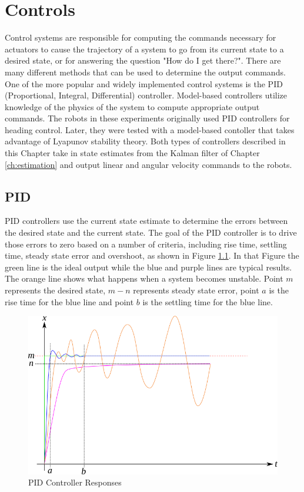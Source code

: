 \chapter{Controls}
\label{ch:controls}
Control systems are responsible for computing the commands necessary for actuators to cause the trajectory of a system to go from its current state to a desired state, or for answering the question "How do I get there?". There are many different methods that can be used to determine the output commands. One of the more popular and widely implemented control systems is the PID (Proportional, Integral, Differential) controller. Model-based controllers utilize knowledge of the physics of the system to compute appropriate output commands. The robots in these experiments originally used PID controllers for heading control. Later, they were tested with a model-based contoller that takes advantage of Lyapunov stability theory. Both types of controllers described in this Chapter take in state estimates from the Kalman filter of Chapter \ref{ch:estimation} and output linear and angular velocity commands to the robots.

\section{PID}
\label{sec:pid}
PID controllers use the current state estimate to determine the errors between the desired state and the current state. The goal of the PID controller is to drive those errors to zero based on a number of criteria, including rise time, settling time, steady state error and overshoot, as shown in Figure \ref{fig:pid}. In that Figure the green line is the ideal output while the blue and purple lines are typical results. The orange line shows what happens when a system becomes unstable. Point $m$ represents the desired state, $m-n$ represents steady state error, point $a$ is the rise time for the blue line and point $b$ is the settling time for the blue line.

\begin{figure}[ht!]
	\centering
	\includegraphics[width=.85\textwidth]{images/pid}
	\caption{PID Controller Responses} 
	\label{fig:pid}
\end{figure}

